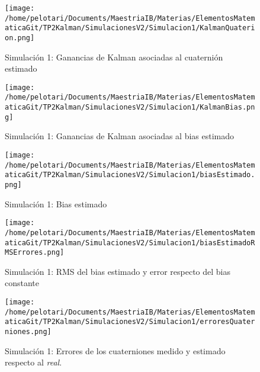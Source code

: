 \documentclass[a4paper,11pt,twoside]{IT-CNEA}
\begin{document}
\begin{figure}[h!]
\centering
\texttt{[image: /home/pelotari/Documents/MaestriaIB/Materias/ElementosMatematicaGit/TP2Kalman/SimulacionesV2/Simulacion1/KalmanQuaterion.png]}
\caption{Simulación 1: Ganancias de Kalman asociadas al cuaternión estimado}
\label{fig:Simulacion1/KalmanQuaterion}
\end{figure}
\begin{figure}[h!]
\centering
\texttt{[image: /home/pelotari/Documents/MaestriaIB/Materias/ElementosMatematicaGit/TP2Kalman/SimulacionesV2/Simulacion1/KalmanBias.png]}
\caption{Simulación 1: Ganancias de Kalman asociadas al bias estimado}
\label{fig:Simulacion1/KalmanBias}
\end{figure}
\begin{figure}[h!]
\centering
\texttt{[image: /home/pelotari/Documents/MaestriaIB/Materias/ElementosMatematicaGit/TP2Kalman/SimulacionesV2/Simulacion1/biasEstimado.png]}
\caption{Simulación 1: Bias estimado}
\label{fig:Simulacion1/biasEstimado}
\end{figure}
\begin{figure}[h!]
\centering
\texttt{[image: /home/pelotari/Documents/MaestriaIB/Materias/ElementosMatematicaGit/TP2Kalman/SimulacionesV2/Simulacion1/biasEstimadoRMSErrores.png]}
\caption{Simulación 1: RMS del bias estimado y error respecto del bias constante}
\label{fig:Simulacion1/biasEstimadoRMSErrores}
\end{figure}
\begin{figure}[h!]
\centering
\texttt{[image: /home/pelotari/Documents/MaestriaIB/Materias/ElementosMatematicaGit/TP2Kalman/SimulacionesV2/Simulacion1/erroresQuaterniones.png]}
\caption{Simulación 1: Errores de los cuaterniones medido y estimado respecto al \textit{real}.}
\label{fig:Simulacion1/erroresQuaterniones}
\end{figure}
\end{document}
